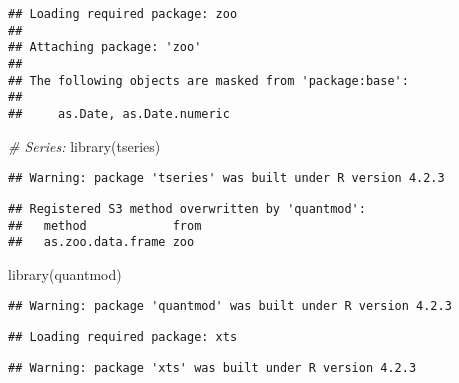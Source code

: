 \documentclass[
]{article}
\newenvironment{Shaded}{\begin{snugshade}}{\end{snugshade}}
\newcommand{\CommentTok}[1]{\textcolor[rgb]{0.56,0.35,0.01}{\textit{#1}}}
\newcommand{\FunctionTok}[1]{\textcolor[rgb]{0.00,0.00,0.00}{#1}}
\newcommand{\NormalTok}[1]{#1}
\begin{document}
\begin{verbatim}
## Loading required package: zoo
## 
## Attaching package: 'zoo'
## 
## The following objects are masked from 'package:base':
## 
##     as.Date, as.Date.numeric
\end{verbatim}

\begin{Shaded}
\begin{Highlighting}[]
\CommentTok{\# Series: }
\FunctionTok{library}\NormalTok{(tseries)}
\end{Highlighting}
\end{Shaded}

\begin{verbatim}
## Warning: package 'tseries' was built under R version 4.2.3
\end{verbatim}

\begin{verbatim}
## Registered S3 method overwritten by 'quantmod':
##   method            from
##   as.zoo.data.frame zoo
\end{verbatim}

\begin{Shaded}
\begin{Highlighting}[]
\FunctionTok{library}\NormalTok{(quantmod)}
\end{Highlighting}
\end{Shaded}

\begin{verbatim}
## Warning: package 'quantmod' was built under R version 4.2.3
\end{verbatim}

\begin{verbatim}
## Loading required package: xts
\end{verbatim}

\begin{verbatim}
## Warning: package 'xts' was built under R version 4.2.3
\end{verbatim}
\end{document}
